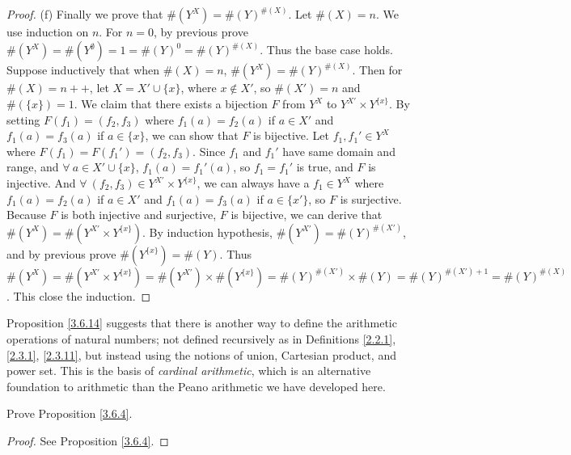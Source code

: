 \begin{proof}{(f)}
    Finally we prove that \(\#(Y^X) = \#(Y)^{\#(X)}\).
    Let \(\#(X) = n\).
    We use induction on \(n\).
    For \(n = 0\), by previous prove \(\#(Y^X) = \#(Y^{\emptyset}) = 1 = \#(Y)^0 = \#(Y)^{\#(X)}\).
    Thus the base case holds.
    Suppose inductively that when \(\#(X) = n\), \(\#(Y^X) = \#(Y)^{\#(X)}\).
    Then for \(\#(X) = n++\), let \(X = X' \cup \{x\}\), where \(x \notin X'\), so \(\#(X') = n\) and \(\#(\{x\}) = 1\).
    We claim that there exists a bijection \(F\) from \(Y^X\) to \(Y^{X'} \times Y^{\{x\}}\).
    By setting \(F(f_1) = (f_2, f_3)\) where \(f_1(a) = f_2(a)\) if \(a \in X'\) and \(f_1(a) = f_3(a)\) if \(a \in \{x\}\), we can show that \(F\) is bijective.
    Let \(f_1, f_1' \in Y^X\) where \(F(f_1) = F(f_1') = (f_2, f_3)\).
    Since \(f_1\) and \(f_1'\) have same domain and range, and \(\forall\ a \in X' \cup \{x\}\), \(f_1(a) = f_1'(a)\), so \(f_1 = f_1'\) is true, and \(F\) is injective.
    And \(\forall\ (f_2, f_3) \in Y^{X'} \times Y^{\{x\}}\), we can always have a \(f_1 \in Y^X\) where \(f_1(a) = f_2(a)\) if \(a \in X'\) and \(f_1(a) = f_3(a)\) if \(a \in \{x'\}\), so \(F\) is surjective.
    Because \(F\) is both injective and surjective, \(F\) is bijective, we can derive that \(\#(Y^X) = \#(Y^{X'} \times Y^{\{x\}})\).
    By induction hypothesis, \(\#(Y^{X'}) = \#(Y)^{\#(X')}\), and by previous prove \(\#(Y^{\{x\}}) = \#(Y)\).
    Thus \(\#(Y^X) = \#(Y^{X'} \times Y^{\{x\}}) = \#(Y^{X'}) \times \#(Y^{\{x\}}) = \#(Y)^{\#(X')} \times \#(Y) = \#(Y)^{\#(X') + 1} = \#(Y)^{\#(X)}\).
    This close the induction.
\end{proof}

\begin{remark}\label{3.6.15}
    Proposition \ref{3.6.14} suggests that there is another way to define the arithmetic operations of natural numbers;
    not defined recursively as in Definitions \ref{2.2.1}, \ref{2.3.1}, \ref{2.3.11}, but instead using the notions of union, Cartesian product, and power set.
    This is the basis of \emph{cardinal arithmetic}, which is an alternative foundation to arithmetic than the Peano arithmetic we have developed here.
\end{remark}

\exercisesection

\begin{exercise}\label{ex 3.6.1}
    Prove Proposition \ref{3.6.4}.
\end{exercise}

\begin{proof}
    See Proposition \ref{3.6.4}.
\end{proof}

